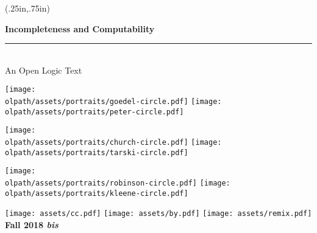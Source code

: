
\thispagestyle{empty}

\pagecolor{ltleadbeater}
  \begin{textblock*}{4.5in}(.25in,.75in)%
    \begin{raggedright}
      \fontsize{26pt}{30pt}\selectfont\bfseries\sffamily%
      Incompleteness and Computability\\[5pt]
      \normalfont\fontsize{18pt}{0pt}\selectfont\bfseries\itshape%
      \rule{4.5in}{5pt}\\[5pt]
      An Open Logic Text
    \end{raggedright}

\vskip1cm

\noindent\texttt{[image: \\olpath/assets/portraits/goedel-circle.pdf]}
\texttt{[image: \\olpath/assets/portraits/peter-circle.pdf]}\\
\centerline{\texttt{[image: \\olpath/assets/portraits/church-circle.pdf]}
\texttt{[image: \\olpath/assets/portraits/tarski-circle.pdf]}}

\hfill\texttt{[image: \\olpath/assets/portraits/robinson-circle.pdf]}
\texttt{[image: \\olpath/assets/portraits/kleene-circle.pdf]}

\vskip1cm

\noindent
\texttt{[image: assets/cc.pdf]}
\texttt{[image: assets/by.pdf]}
\texttt{[image: assets/remix.pdf]}
\normalfont\fontsize{16pt}{0pt}\selectfont\bfseries\sffamily%
\hfill Fall 2018 \textit{bis}
\end{textblock*}
\

\clearpage
\setcounter{page}{1}
\nopagecolor


